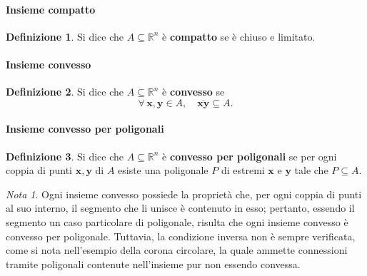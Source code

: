 \documentclass{article}
\theoremstyle{plain}
\theoremstyle{definition}
\newtheorem{defn}{Definizione}[section]
\theoremstyle{remark}
\newtheorem{note}{Nota}
\begin{document}
\vspace{10pt}

\paragraph{Insieme compatto}
\begin{bxthm}
\begin{defn}
    Si dice che $A\subseteq\mathbb{R}^n$ è \textbf{compatto} se è chiuso e limitato.
\end{defn}
\end{bxthm}

\vspace{10pt}

\paragraph{Insieme convesso}
\begin{bxthm}
\begin{defn}
    Si dice che $A\subseteq\mathbb{R}^n$ è \textbf{convesso} se 
    \[\forall\, \mathbf{x},\mathbf{y}\in A,\quad \overline{\mathbf{xy}}\subseteq A.\]
\end{defn}
\end{bxthm}

\vspace{10pt}

\paragraph{Insieme convesso per poligonali}
\begin{bxthm}
\begin{defn}
    Si dice che $A\subseteq\mathbb{R}^n$ è \textbf{convesso per poligonali} se per ogni coppia di punti 
    $\mathbf{x},\mathbf{y}$ di $A$ esiste una poligonale $P$ di estremi $\mathbf{x}$ e $\mathbf{y}$ tale che $P\subseteq A$.
\end{defn}
\end{bxthm}

\vspace{10pt}

\begin{note}
    Ogni insieme convesso possiede la proprietà che, per ogni coppia di punti al suo interno, il segmento che li unisce è contenuto in esso; pertanto, 
    essendo il segmento un caso particolare di poligonale, risulta che ogni insieme convesso è convesso per poligonale. 
    Tuttavia, la condizione inversa non è sempre verificata, come si nota nell'esempio della corona circolare, la quale ammette connessioni tramite 
    poligonali contenute nell'insieme pur non essendo convessa.
\end{note}
\end{document}
